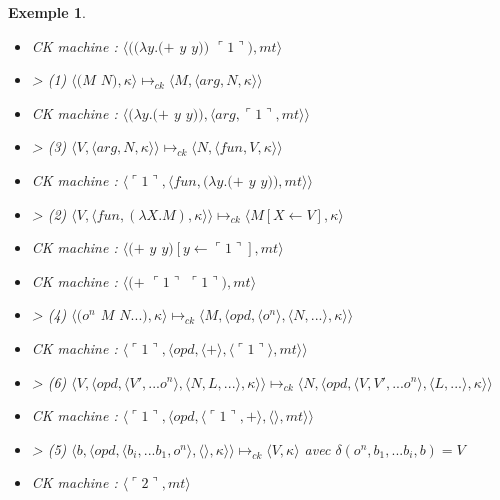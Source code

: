\documentclass[10pt,a4paper]{report}
\newtheorem{ex}{Exemple}
\begin{document}
\begin{ex}
\begin{itemize}
			\item[] CK machine : $\langle((\lambda y.(+$ $y$ $y))$ $\ulcorner 1\urcorner),mt\rangle$
			\item[] > (1) $\langle(M$ $N),\kappa\rangle \longmapsto_{ck} \langle M,\langle arg,N,\kappa\rangle\rangle$
			\item[] CK machine : $\langle(\lambda y.(+$ $y$ $y)),\langle arg,\ulcorner 1\urcorner,mt\rangle\rangle$	
			\item[] > (3) $\langle V,\langle arg,N,\kappa \rangle \rangle \longmapsto_{ck} \langle N,\langle fun,V,\kappa \rangle \rangle$
			\item[] CK machine : $\langle\ulcorner 1\urcorner,\langle fun,(\lambda y.(+$ $y$ $y)),mt\rangle\rangle$	
			\item[] > (2) $\langle V,\langle fun,(\lambda X.M),\kappa \rangle \rangle \longmapsto_{ck} \langle M[X \leftarrow V],\kappa\rangle$	
			\item[] CK machine : $\langle(+$ $y$ $y)[y \leftarrow\ulcorner 1\urcorner],mt\rangle$
			\item[] CK machine : $\langle(+$ $\ulcorner 1\urcorner$ $\ulcorner 1\urcorner),mt\rangle$
			\item[] > (4) $\langle(o^{n}$ $M$ $N...),\kappa\rangle \longmapsto_{ck} \langle M,\langle opd,\langle o^{n}\rangle,\langle N,...\rangle,\kappa\rangle\rangle$
			\item[] CK machine : $\langle\ulcorner 1\urcorner,\langle opd,\langle + \rangle,\langle\ulcorner 1\urcorner\rangle,mt\rangle\rangle$
			\item[] > (6) $\langle V,\langle opd,\langle V',...o^{n}\rangle,\langle N,L,...\rangle,\kappa\rangle\rangle \longmapsto_{ck} \langle N,\langle opd,\langle V,V',...o^{n}\rangle,\langle L,...\rangle,\kappa\rangle\rangle$
			\item[] CK machine : $\langle\ulcorner 1\urcorner,\langle opd,\langle\ulcorner 1\urcorner,+ \rangle,\langle\rangle,mt\rangle\rangle$
			\item[] > (5) $\langle b,\langle opd,\langle b_{i},...b_{1},o^{n}\rangle,\langle\rangle,\kappa\rangle\rangle \longmapsto_{ck} \langle V,\kappa\rangle$ avec $\delta(o^{n},b_{1},...b_{i},b) = V$
			\item[] CK machine : $\langle\ulcorner 2\urcorner,mt\rangle$
		\end{itemize}
	\end{ex}
	\newpage
	
	
	
\end{document}
